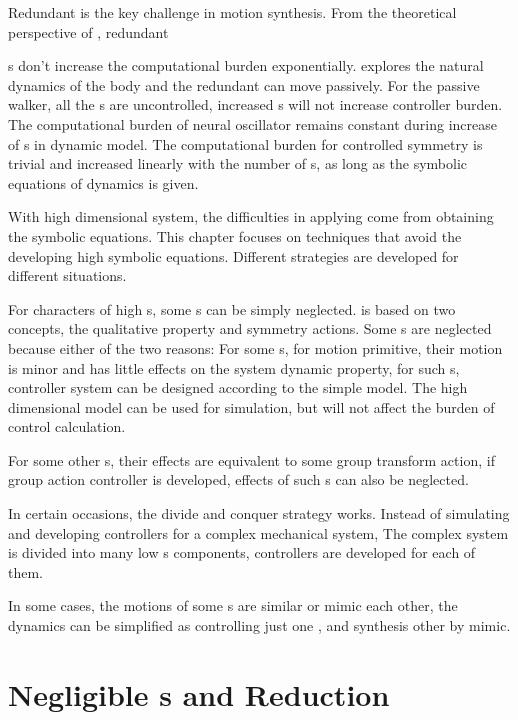 Redundant {\dof} is the key challenge in motion synthesis.
From the theoretical perspective of \moit, redundant {\dof s don't increase the computational burden exponentially.
\moit explores the natural dynamics of the body and the redundant {\dof} can move passively.
For the passive walker, all the \dof s are uncontrolled, increased {\dof} s will not increase controller burden.
The computational burden of neural oscillator remains constant during increase of {\dof} s in dynamic model.
The computational burden for controlled symmetry is trivial and increased linearly with the number of {\dof} s, as long as the symbolic equations of dynamics is given.

With high dimensional system,  the difficulties in applying \moit  come from  obtaining the symbolic equations.
This chapter focuses on techniques that avoid the developing high \dof symbolic equations.
Different strategies are developed for different situations.

\begin{itemize}
For characters of high {\dof}s, some {\dof}s can be simply neglected.
\moit is based on two concepts, the qualitative property and symmetry actions.
Some \dof s are neglected because either of the two reasons:
For some {\dof}s, for motion primitive, their motion is minor and has little effects on the system dynamic property, for such {\dof}s, controller system can be designed according to the simple model. 
The high dimensional model can be used for simulation, but will not affect the burden of control calculation.

For some other {\dof}s, their effects are equivalent to some group transform action, if group action controller is developed, effects of such {\dof}s can also be neglected.

In certain occasions, the divide and conquer strategy works.
Instead of simulating and developing controllers for a complex mechanical system, The complex system is divided into many  low {\dof}s components, controllers are developed for each of them.

In some cases, the motions of some {\dof}s are similar or mimic each other, the dynamics can be simplified as controlling just one {\dof}, and synthesis other {\dof} by mimic.
\end{itemize} 

\section{Negligible {\dof}s and Reduction}
}
